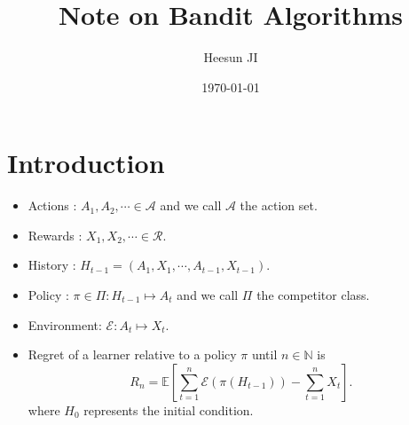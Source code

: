 \documentclass[10pt]{article}
\theoremstyle{definition}
\newenvironment{definition*}[1]{%
  \IfBlankTF{#1}
    {\renewcommand{\themanualdefinitioninner}{\unskip}}
    {\renewcommand\themanualdefinitioninner{#1}}%
  \manualdefinitioninner
}{\endmanualdefinitioninner}
\begin{document}
\title{Note on Bandit Algorithms}
\author{Heesun JI}
\date{\today}
\maketitle


\section{Introduction}

\begin{definition*}{}
    \leavevmode
    \begin{itemize}
        \item Actions : ${A_1, A_2, \cdots } \in \mathcal{A}$ and we call $\mathcal{A}$ the action set.
        \item Rewards : ${X_1, X_2, \cdots } \in \mathcal{R}$.
        \item History : $H_{t-1} = (A_1, X_1, \cdots, A_{t-1}, X_{t-1})$.
        \item Policy : $\pi \in \Pi : H_{t-1} \mapsto A_t$ and we call $\Pi$ the competitor class.
        \item Environment: $\mathcal{E} : A_t \mapsto X_t$.
        \item Regret of a learner relative to a policy $\pi$ until $n \in \mathbb{N}$ is 
        \begin{equation*}
            R_n = \mathbb{E}\left[ \sum_{t=1}^{n} \mathcal{E}(\pi (H_{t-1})) - \sum_{t=1}^{n} X_t \right].
        \end{equation*}
        where $H_0$ represents the initial condition.
    \end{itemize}
\end{definition*}
\end{document}
